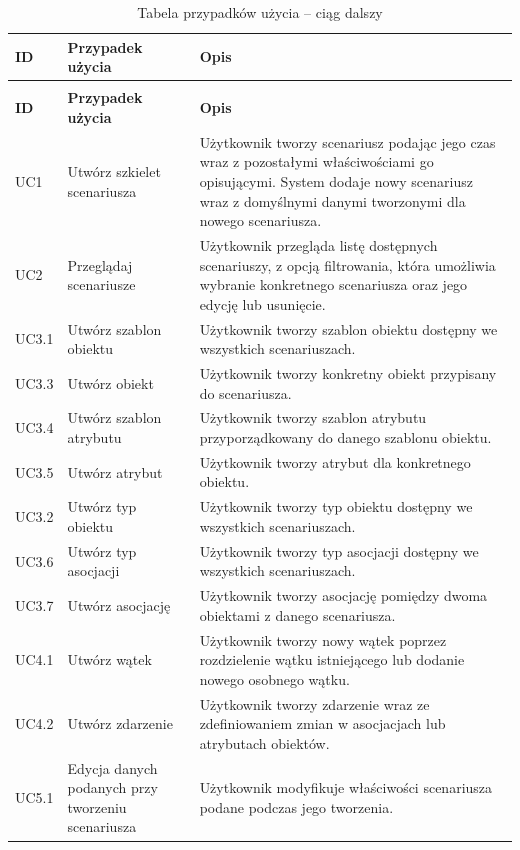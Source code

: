 \begin{longtable}{|p{1cm}|p{5cm}|p{9cm}|}
\caption{Tabela przypadków użycia} \label{tab:use_case_table} \\ %
\hline
\textbf{ID} & \textbf{Przypadek użycia} & \textbf{Opis} \\
\hline
\endfirsthead
\caption[]{Tabela przypadków użycia -- ciąg dalszy} \\ %
\hline
\textbf{ID} & \textbf{Przypadek użycia} & \textbf{Opis} \\
\hline
\endhead
\hline
\endfoot
\hline
\endlastfoot
UC1 & Utwórz szkielet scenariusza & Użytkownik tworzy scenariusz podając jego czas wraz z pozostałymi właściwościami go opisującymi. System dodaje nowy scenariusz wraz z domyślnymi danymi tworzonymi dla nowego scenariusza. \\
\hline
UC2 & Przeglądaj scenariusze & Użytkownik przegląda listę dostępnych scenariuszy, z opcją filtrowania, która umożliwia wybranie konkretnego scenariusza oraz jego edycję lub usunięcie. \\
\hline
UC3.1 & Utwórz szablon obiektu & Użytkownik tworzy szablon obiektu dostępny we wszystkich scenariuszach. \\
\hline
UC3.3 & Utwórz obiekt & Użytkownik tworzy konkretny obiekt przypisany do scenariusza. \\
\hline
UC3.4 & Utwórz szablon atrybutu & Użytkownik tworzy szablon atrybutu przyporządkowany do danego szablonu obiektu. \\
\hline
UC3.5 & Utwórz atrybut & Użytkownik tworzy atrybut dla konkretnego obiektu. \\
\hline
UC3.2 & Utwórz typ obiektu & Użytkownik tworzy typ obiektu dostępny we wszystkich scenariuszach. \\
\hline
UC3.6 & Utwórz typ asocjacji & Użytkownik tworzy typ asocjacji dostępny we wszystkich scenariuszach. \\
\hline
UC3.7 & Utwórz asocjację & Użytkownik tworzy asocjację pomiędzy dwoma obiektami z danego scenariusza. \\
\hline
UC4.1 & Utwórz wątek & Użytkownik tworzy nowy wątek poprzez rozdzielenie wątku istniejącego lub dodanie nowego osobnego wątku. \\
\hline
UC4.2 & Utwórz zdarzenie & Użytkownik tworzy zdarzenie wraz ze zdefiniowaniem zmian w asocjacjach lub atrybutach obiektów. \\
\hline
UC5.1 & Edycja danych podanych przy tworzeniu scenariusza & Użytkownik modyfikuje właściwości scenariusza podane podczas jego tworzenia. \\

\end{longtable}
